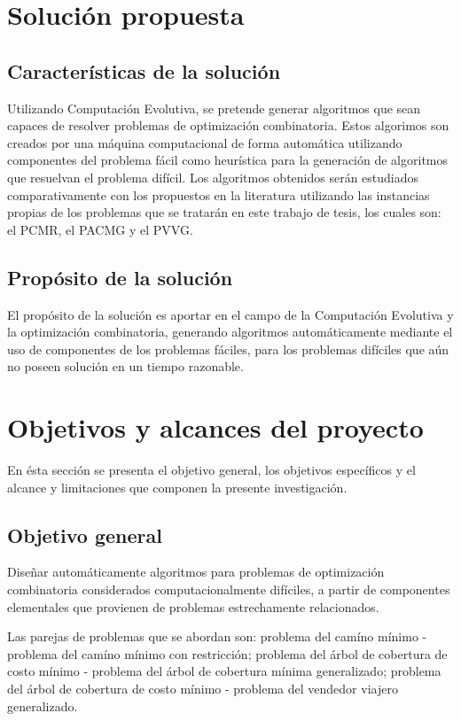 \section{Solución propuesta}
\label{intro:solucion}


\subsection{Características de la solución}

Utilizando Computación Evolutiva, se pretende generar algoritmos que sean capaces de resolver problemas de optimización combinatoria. Estos algorimos son creados por una máquina computacional de forma automática utilizando componentes del problema fácil como heurística para la generación de algoritmos que resuelvan el problema difícil. Los algoritmos obtenidos serán estudiados comparativamente con los propuestos en la literatura utilizando las instancias propias de los problemas 
que se tratarán en este trabajo de tesis, los cuales son: el PCMR, el PACMG y el PVVG. 

\subsection{Propósito de la solución}

El propósito de la solución es aportar en el campo de la Computación Evolutiva y la optimización combinatoria, generando algoritmos automáticamente mediante el uso de componentes de los problemas fáciles, para los problemas difíciles que aún no poseen solución en un tiempo razonable.


\section{Objetivos y alcances del proyecto}
\label{intro:objetivos}
En ésta sección se presenta el objetivo general, los objetivos específicos y el alcance y limitaciones que componen la presente investigación.

\subsection{Objetivo general}

Diseñar automáticamente algoritmos para problemas de optimización combinatoria considerados computacionalmente difíciles, a partir de componentes elementales que provienen de problemas estrechamente relacionados.

Las parejas de problemas que se abordan son: problema del camíno mínimo - problema del camíno mínimo con restricción; problema del árbol de cobertura de costo mínimo - problema del árbol de cobertura mínima generalizado; problema del árbol de cobertura de costo mínimo - problema del vendedor viajero generalizado. 

